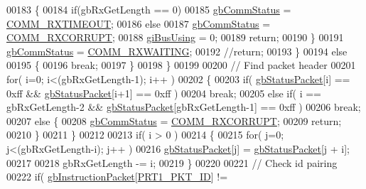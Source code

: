 \begin{DoxyCode}
00183             \{
00184                 \textcolor{keywordflow}{if}(gbRxGetLength == 0)
00185                     \hyperlink{classdynamixel_a5b603f6bed7ccc595f1f50bd6a6ebbfc}{gbCommStatus} = \hyperlink{dynamixel_8h_af9976398353d104bb8a78b1f02f9fceb}{COMM\_RXTIMEOUT};
00186                 \textcolor{keywordflow}{else}
00187                     \hyperlink{classdynamixel_a5b603f6bed7ccc595f1f50bd6a6ebbfc}{gbCommStatus} = \hyperlink{dynamixel_8h_a93c30bd345d8077112f0a3524d26278b}{COMM\_RXCORRUPT};
00188                 \hyperlink{classdynamixel_ad10e0e49f5fef04bf789a89c14cc470a}{giBusUsing} = 0;
00189                 \textcolor{keywordflow}{return};
00190             \}
00191             \hyperlink{classdynamixel_a5b603f6bed7ccc595f1f50bd6a6ebbfc}{gbCommStatus} = \hyperlink{dynamixel_8h_ae4b5e71a685506956bf151e3117f3487}{COMM\_RXWAITING};
00192             \textcolor{comment}{//return;           }
00193         \}
00194         \textcolor{keywordflow}{else}
00195         \{
00196             \textcolor{keywordflow}{break};
00197         \}
00198     \}
00199 
00200     \textcolor{comment}{// Find packet header}
00201     \textcolor{keywordflow}{for}( i=0; i<(gbRxGetLength-1); i++ )
00202     \{
00203         \textcolor{keywordflow}{if}( \hyperlink{classdynamixel_aa57c86d3bbbeaf5c9d4f6bd00376b04f}{gbStatusPacket}[i] == 0xff && \hyperlink{classdynamixel_aa57c86d3bbbeaf5c9d4f6bd00376b04f}{gbStatusPacket}[i+1] == 0xff )
00204             \textcolor{keywordflow}{break};
00205         \textcolor{keywordflow}{else} \textcolor{keywordflow}{if}( i == gbRxGetLength-2 && \hyperlink{classdynamixel_aa57c86d3bbbeaf5c9d4f6bd00376b04f}{gbStatusPacket}[gbRxGetLength-1] == 0xff )
00206             \textcolor{keywordflow}{break};
00207         \textcolor{keywordflow}{else} \{
00208             \hyperlink{classdynamixel_a5b603f6bed7ccc595f1f50bd6a6ebbfc}{gbCommStatus} = \hyperlink{dynamixel_8h_a93c30bd345d8077112f0a3524d26278b}{COMM\_RXCORRUPT};
00209             \textcolor{keywordflow}{return};
00210         \}
00211     \}
00212 
00213     \textcolor{keywordflow}{if}( i > 0 )
00214     \{
00215         \textcolor{keywordflow}{for}( j=0; j<(gbRxGetLength-i); j++ )
00216             \hyperlink{classdynamixel_aa57c86d3bbbeaf5c9d4f6bd00376b04f}{gbStatusPacket}[j] = \hyperlink{classdynamixel_aa57c86d3bbbeaf5c9d4f6bd00376b04f}{gbStatusPacket}[j + i];
00217             
00218         gbRxGetLength -= i;     
00219     \}
00220 
00221     \textcolor{comment}{// Check id pairing}
00222     \textcolor{keywordflow}{if}( \hyperlink{classdynamixel_afd94dcf01b8e96298727776e222de722}{gbInstructionPacket}[\hyperlink{dynamixel_8h_a3c2bb339c587abadd977eb2f14daeff9}{PRT1\_PKT\_ID}] != 

\end{DoxyCode}
